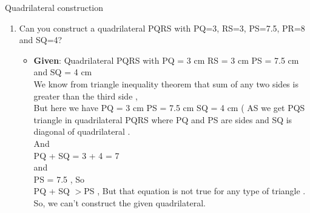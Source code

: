 \begin{frame}{Quadrilateral construction}
\begin{enumerate}
\conti
\item Can you construct a quadrilateral PQRS with PQ=3, RS=3, PS=7.5, PR=8 and SQ=4?\\
\begin{itemize}
\item \textbf{Given}:  Quadrilateral PQRS with PQ = 3 cm RS =  3 cm PS = 7.5 cm and SQ = 4 cm\\

We know from triangle inequality theorem that sum of any two sides is greater than the third side ,\\
But here we have PQ = 3 cm PS =  7.5 cm SQ = 4 cm ( AS we get PQS triangle in quadrilateral PQRS where PQ and PS are sides and SQ is diagonal of quadrilateral . \\

And\\

PQ + SQ = 3 + 4 = 7\\

and\\

PS = 7.5 , So\\

PQ + SQ $>$PS , But that equation is not true for any type of triangle .\\
So, we can't construct the given quadrilateral.
\seti
\end{itemize}
\end{enumerate}
\end{frame}
